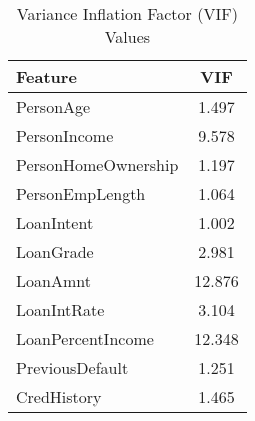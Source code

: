 \begin{table}[H]\centering
\caption{Variance Inflation Factor (VIF) Values}
\label{Table 4:vif_values}
\begin{tabular}{lc}
\toprule
Feature & VIF \\
\midrule
PersonAge & 1.497 \\
PersonIncome & 9.578 \\
PersonHomeOwnership & 1.197 \\
PersonEmpLength & 1.064 \\
LoanIntent & 1.002 \\
LoanGrade & 2.981 \\
LoanAmnt & 12.876 \\
LoanIntRate & 3.104 \\
LoanPercentIncome & 12.348 \\
PreviousDefault & 1.251 \\
CredHistory & 1.465 \\
\bottomrule
\end{tabular}
\end{table}

